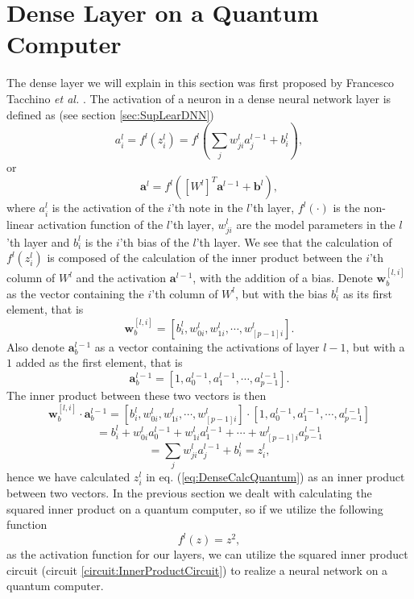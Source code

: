 \section{Dense Layer on a Quantum Computer}
\label{sec:DNNQuantum}
The dense layer we will explain in this section was first proposed by Francesco Tacchino \textit{et al.} \cite{InnerProductArtificialNeuron}.
The activation of a neuron in a dense neural network layer is defined as (see section \ref{sec:SupLearDNN})
\begin{equation}
    \label{eq:DenseCalcQuantum}
    a_i^l = f^l(z_i^l) = f^l(\sum_j w_{ji}^{l}a^{l-1}_j + b_i^l ),
\end{equation}
or
$$\boldsymbol{a}^l = f^l([W^l]^T\boldsymbol{a}^{l-1} + \boldsymbol{b}^l), $$
where $a_i^l$ is the activation of the $i$'th note in the $l$'th layer, $f^l(\cdot)$ is the non-linear activation function of the $l$'th layer, $w_{ji}^l$ are the model parameters in the $l$'th layer and $b_i^l$ is the $i$'th bias of the $l$'th layer. We see that the calculation of $f^l(z_i^l)$ is composed of the calculation of the inner product between the $i$'th column of $W
^l$ and the activation $\boldsymbol{a}
^{l-1}$, with the addition of a bias. Denote $\boldsymbol{w}^{[l,i]}_b$ as the vector containing the $i$'th column of $W^l$, but with the bias $b^l_i$ as its first element, that is
\begin{equation}
    \label{eq:WeightsWithBias}
    \boldsymbol{w}^{[l,i]}_b = [b^l_i, w^{l}_{0i},w^{l}_{1i},\cdots,w^{l}_{[p-1]i}].
\end{equation}
Also denote $\boldsymbol{a}^{l-1}_b$ as a vector containing the activations of layer $l-1$, but with a $1$ added as the first element, that is
\begin{equation}
    \label{eq:ActivationWithBias}
    \boldsymbol{a}^{l-1}_b = [1, a^{l-1}_0,a^{l-1}_1,\cdots,a^{l-1}_{p-1}].
\end{equation}
The inner product between these two vectors is then
$$\boldsymbol{w}^{[l,i]}_b\cdot \boldsymbol{a}^{l-1}_b = [b^l_i, w^{l}_{0i},w^{l}_{1i},\cdots,w^{l}_{[p-1]i}]\cdot [1, a^{l-1}_0,a^{l-1}_1,\cdots,a^{l-1}_{p-1}] $$
$$ = b_i^l + w^l_{0i}a_0^{l-1} + w^l_{1i}a_1^{l-1} + \cdots + w^l_{[p-1]i}a^{l-1}_{p-1}$$
$$ = \sum_j w_{ji}^{l}a^{l-1}_j + b_i^l = z^l_i,$$
hence we have calculated $z^l_i$ in eq. (\ref{eq:DenseCalcQuantum}) as an inner product between two vectors.
In the previous section we dealt with calculating the squared inner product on a quantum computer, so if we utilize the following function 
$$
f^l(z) = z^2,
$$
as the activation function for our layers, we can utilize the squared inner product circuit (circuit  \ref{circuit:InnerProductCircuit}) to realize a neural network on a quantum computer. 
